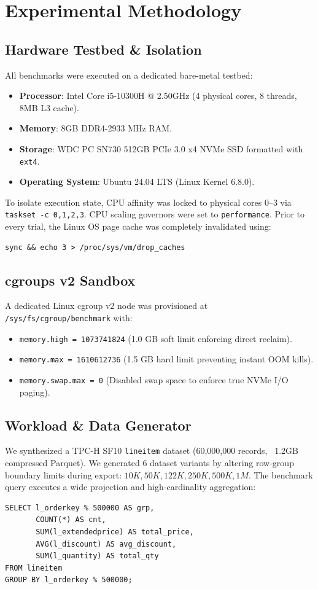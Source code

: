 \documentclass[sigconf,nonacm]{acmart}
\begin{document}
\section{Experimental Methodology}

\subsection{Hardware Testbed \& Isolation}
All benchmarks were executed on a dedicated bare-metal testbed:
\begin{itemize}
    \item \textbf{Processor}: Intel Core i5-10300H @ 2.50GHz (4 physical cores, 8 threads, 8MB L3 cache).
    \item \textbf{Memory}: 8GB DDR4-2933 MHz RAM.
    \item \textbf{Storage}: WDC PC SN730 512GB PCIe 3.0 x4 NVMe SSD formatted with \texttt{ext4}.
    \item \textbf{Operating System}: Ubuntu 24.04 LTS (Linux Kernel 6.8.0).
\end{itemize}

To isolate execution state, CPU affinity was locked to physical cores 0--3 via \texttt{taskset -c 0,1,2,3}. CPU scaling governors were set to \texttt{performance}. Prior to every trial, the Linux OS page cache was completely invalidated using:
\begin{verbatim}
sync && echo 3 > /proc/sys/vm/drop_caches
\end{verbatim}

\subsection{cgroups v2 Sandbox}
A dedicated Linux cgroup v2 node was provisioned at \texttt{/sys/fs/cgroup/benchmark} with:
\begin{itemize}
    \item \texttt{memory.high = 1073741824} (1.0 GB soft limit enforcing direct reclaim).
    \item \texttt{memory.max = 1610612736} (1.5 GB hard limit preventing instant OOM kills).
    \item \texttt{memory.swap.max = 0} (Disabled swap space to enforce true NVMe I/O paging).
\end{itemize}

\subsection{Workload \& Data Generator}
We synthesized a TPC-H SF10 \texttt{lineitem} dataset (60,000,000 records, ~1.2GB compressed Parquet). We generated 6 dataset variants by altering row-group boundary limits during export: $10K, 50K, 122K, 250K, 500K, 1M$.
The benchmark query executes a wide projection and high-cardinality aggregation:
\begin{verbatim}
SELECT l_orderkey % 500000 AS grp,
       COUNT(*) AS cnt,
       SUM(l_extendedprice) AS total_price,
       AVG(l_discount) AS avg_discount,
       SUM(l_quantity) AS total_qty
FROM lineitem
GROUP BY l_orderkey % 500000;
\end{verbatim}
\end{document}
